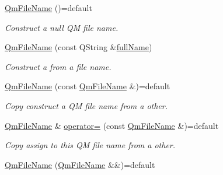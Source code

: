 \begin{DoxyCompactItemize}
\item 
\hyperlink{class_mdt_1_1_translation_1_1_qm_file_name_a52c67eb3c23ad934c3abc544d4af893f}{Qm\+File\+Name} ()=default\hypertarget{class_mdt_1_1_translation_1_1_qm_file_name_a52c67eb3c23ad934c3abc544d4af893f}{}\label{class_mdt_1_1_translation_1_1_qm_file_name_a52c67eb3c23ad934c3abc544d4af893f}

\begin{DoxyCompactList}\small\item\em Construct a null QM file name. \end{DoxyCompactList}\item 
\hyperlink{class_mdt_1_1_translation_1_1_qm_file_name_ab94672121bc30f734d2132853035c3f5}{Qm\+File\+Name} (const Q\+String \&\hyperlink{class_mdt_1_1_translation_1_1_qm_file_name_afdd50f953fe8a694aa1e7a5b87b4903e}{full\+Name})
\begin{DoxyCompactList}\small\item\em Construct a from a file name. \end{DoxyCompactList}\item 
\hyperlink{class_mdt_1_1_translation_1_1_qm_file_name_a2fd825c5c9ed6f1c04ce9d7c048241ad}{Qm\+File\+Name} (const \hyperlink{class_mdt_1_1_translation_1_1_qm_file_name}{Qm\+File\+Name} \&)=default\hypertarget{class_mdt_1_1_translation_1_1_qm_file_name_a2fd825c5c9ed6f1c04ce9d7c048241ad}{}\label{class_mdt_1_1_translation_1_1_qm_file_name_a2fd825c5c9ed6f1c04ce9d7c048241ad}

\begin{DoxyCompactList}\small\item\em Copy construct a QM file name from a other. \end{DoxyCompactList}\item 
\hyperlink{class_mdt_1_1_translation_1_1_qm_file_name}{Qm\+File\+Name} \& \hyperlink{class_mdt_1_1_translation_1_1_qm_file_name_a814a75be754ec9ce41ce0db7b133f4ab}{operator=} (const \hyperlink{class_mdt_1_1_translation_1_1_qm_file_name}{Qm\+File\+Name} \&)=default\hypertarget{class_mdt_1_1_translation_1_1_qm_file_name_a814a75be754ec9ce41ce0db7b133f4ab}{}\label{class_mdt_1_1_translation_1_1_qm_file_name_a814a75be754ec9ce41ce0db7b133f4ab}

\begin{DoxyCompactList}\small\item\em Copy assign to this QM file name from a other. \end{DoxyCompactList}\item 
\hyperlink{class_mdt_1_1_translation_1_1_qm_file_name_a194890128a99e417fba7010d65e9806f}{Qm\+File\+Name} (\hyperlink{class_mdt_1_1_translation_1_1_qm_file_name}{Qm\+File\+Name} \&\&)=default\hypertarget{class_mdt_1_1_translation_1_1_qm_file_name_a194890128a99e417fba7010d65e9806f}{}\label{class_mdt_1_1_translation_1_1_qm_file_name_a194890128a99e417fba7010d65e9806f}


\end{DoxyCompactItemize}
